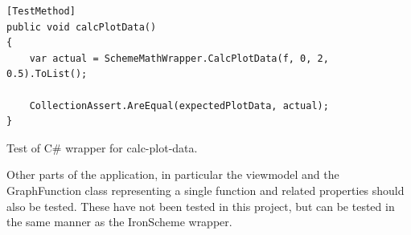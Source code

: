\documentclass[a4paper,12pt]{article}
\newcommand{\code}[1]{{\fontfamily{pcr}\selectfont #1}}
\begin{document}
\begin{listing}[H]
\begin{verbatim}
[TestMethod]
public void calcPlotData()
{
    var actual = SchemeMathWrapper.CalcPlotData(f, 0, 2, 0.5).ToList();

    CollectionAssert.AreEqual(expectedPlotData, actual);
}
\end{verbatim}	

\caption{Test of C\# wrapper for \code{calc-plot-data}.}
\label{lst:SchemeTest}
\end{listing}

Other parts of the application, in particular the viewmodel and  the GraphFunction class representing a single function and related properties should also be tested. These have not been tested in this project, but can be tested in the same manner as the IronScheme wrapper. 

	
\end{document}

